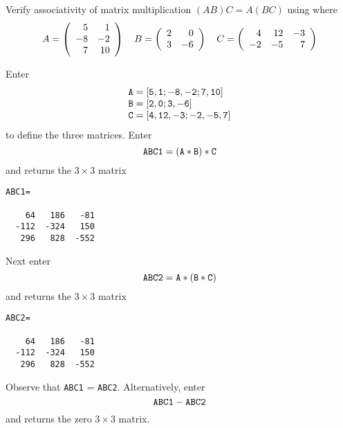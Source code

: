 \documentclass{ximera}
\begin{document}
\begin{computerExercise}\label{YZ_3.6_assoc3}
Verify associativity of matrix multiplication $(AB)C=A(BC)$ using \Matlab where
\[
A=\left(\begin{array}{rrrrrrrrrrrrrrrrrr} 5&1\\-8&-2\\7&10 \end{array}\right)\quad B=\left(\begin{array}{rrrrrrrrrrrrrrrrrr} 2&0\\3&-6 \end{array}\right) \quad C=\left(\begin{array}{rrrrrrrrrrrrrrrrrr} 4&12&-3\\-2&-5&7 \end{array}\right)
\]

\begin{solution}
\soln
Enter 
\[
\begin{array}{l}
{\tt A = [5,1;-8,-2;7,10]} \\
{\tt B = [2,0;3,-6]} \\
{\tt C = [4,12,-3;-2,-5,7]}
\end{array}
\]
to define the three matrices.  Enter 
\[
{\tt ABC1 = (A * B)*C} 
\]
and \Matlab returns the $3\times 3$ matrix
\begin{verbatim}
ABC1=

    64   186   -81
  -112  -324   150
   296   828  -552
\end{verbatim}
Next enter 
\[
{\tt ABC2 = A * ( B*C)} 
\]
and \Matlab returns the $3\times 3$ matrix
\begin{verbatim}
ABC2=

    64   186   -81
  -112  -324   150
   296   828  -552
\end{verbatim}

Observe that {\tt ABC1} = {\tt ABC2}.  Alternatively,  enter 
\[
{\tt ABC1 - ABC2} 
\]
and \Matlab returns the zero $3\times 3$ matrix.
\end{solution}

\end{computerExercise}
\end{document}
